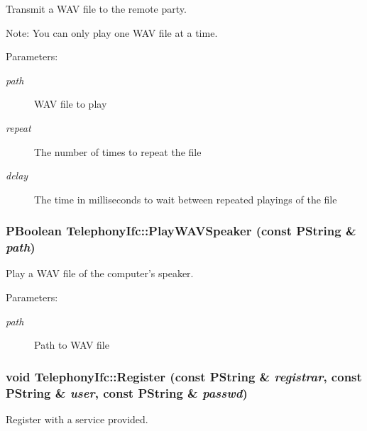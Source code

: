 Transmit a WAV file to the remote party. 

\begin{Desc}
\item[Note:]You can only play one WAV file at a time. \end{Desc}
\begin{Desc}
\item[Parameters:]
\begin{description}
\item[{\em path}]WAV file to play \item[{\em repeat}]The number of times to repeat the file \item[{\em delay}]The time in milliseconds to wait between repeated playings of the file \end{description}
\end{Desc}
\hypertarget{classTelephonyIfc_84e1d2f8049e2085d84856f9c03a687f}{
\subsubsection[{PlayWAVSpeaker}]{\setlength{\rightskip}{0pt plus 5cm}PBoolean TelephonyIfc::PlayWAVSpeaker (const PString \& {\em path})}}
\label{classTelephonyIfc_84e1d2f8049e2085d84856f9c03a687f}


Play a WAV file of the computer's speaker. 

\begin{Desc}
\item[Parameters:]
\begin{description}
\item[{\em path}]Path to WAV file \end{description}
\end{Desc}
\hypertarget{classTelephonyIfc_ddbfc63168d5e70fd4f83469de4aabb7}{
\subsubsection[{Register}]{\setlength{\rightskip}{0pt plus 5cm}void TelephonyIfc::Register (const PString \& {\em registrar}, \/  const PString \& {\em user}, \/  const PString \& {\em passwd})}}
\label{classTelephonyIfc_ddbfc63168d5e70fd4f83469de4aabb7}


Register with a service provided. 

